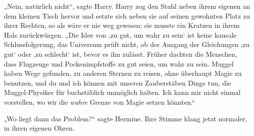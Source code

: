 „Nein, natürlich nicht“, sagte Harry. Harry zog den Stuhl neben ihrem eigenen an dem kleinen Tisch hervor und setzte sich neben sie auf seinen gewohnten Platz zu ihrer Rechten, so als wäre er nie weg gewesen; sie musste ein Kratzen in ihrem Hals zurückwürgen. „Die Idee von ‚zu gut, um wahr zu sein‘ ist keine kausale Schlussfolgerung, das Universum prüft nicht, ob der Ausgang der Gleichungen ‚zu gut‘ oder ‚zu schlecht‘ ist, bevor es ihn zulässt. Früher dachten die Menschen, dass Flugzeuge und Pockenimpfstoffe zu gut seien, um wahr zu sein. Muggel haben Wege gefunden, zu anderen Sternen zu reisen, ohne überhaupt Magie zu benutzen, und du und ich können mit unseren Zauberstäben Dinge tun, die Muggel-Physiker für buchstäblich unmöglich halten. Ich kann mir nicht einmal vorstellen, wo wir die \emph{wahre} Grenze von Magie setzen könnten.“

„Wo liegt dann das Problem?“ sagte Hermine. Ihre Stimme klang jetzt normaler, in ihren eigenen Ohren.

